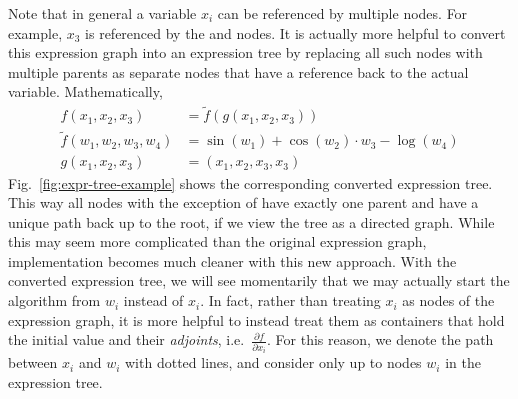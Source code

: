 Note that in general a variable $x_i$ can be referenced by multiple nodes.
For example, $x_3$ is referenced by the \code{*} and  nodes.
It is actually more helpful to convert this expression graph into an expression tree
by replacing all such nodes with multiple parents as separate nodes
that have a reference back to the actual variable.
Mathematically,
\begin{align}
    f(x_1, x_2, x_3) &= \tilde{f}(g(x_1, x_2, x_3)) \label{eq:f-tree-example} \\
    \tilde{f}(w_1, w_2, w_3, w_4) &= \sin(w_1) + \cos(w_2) \cdot w_3 - \log(w_4) \nonumber \\
    g(x_1, x_2, x_3) &= (x_1, x_2, x_3, x_3) \nonumber
\end{align}
Fig.~\ref{fig:expr-tree-example} shows the corresponding converted expression tree.
This way all nodes with the exception of  have exactly one parent
and have a unique path back up to the root, if we view the tree as a directed graph.
While this may seem more complicated than the original expression graph,
implementation becomes much cleaner with this new approach.
With the converted expression tree, we will see momentarily that 
we may actually start the algorithm from $w_i$ instead of $x_i$.
In fact, rather than treating $x_i$ as nodes of the expression graph,
it is more helpful to instead treat them as containers 
that hold the initial value and their \emph{adjoints}, 
i.e.\ $\frac{\partial f}{\partial x_i}$.
For this reason, we denote the path between $x_i$ and $w_i$ with dotted lines,
and consider only up to nodes $w_i$ in the expression tree.

